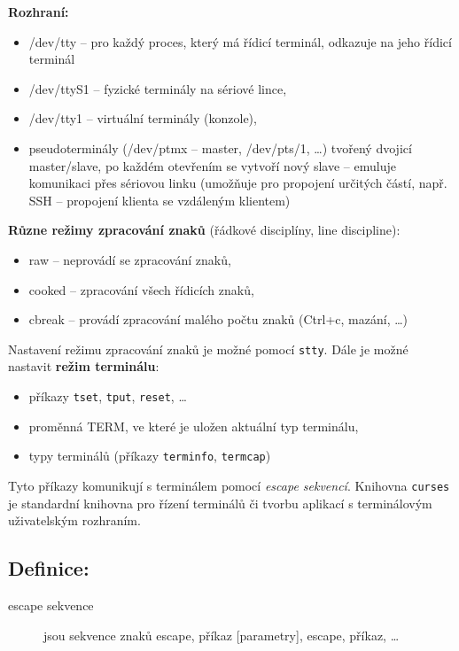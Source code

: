 \documentclass[a4paper, 11pt]{article}
\newcommand{\tcmd}[1]{\texttt{#1}}
\begin{document}
\textbf{Rozhraní:}
\begin{itemize}
    \item /dev/tty -- pro každý proces, který má řídicí terminál, odkazuje na jeho řídicí terminál
    \item /dev/ttyS1 -- fyzické terminály na sériové lince,
    \item /dev/tty1 -- virtuální terminály (konzole),
    \item pseudoterminály (/dev/ptmx -- master, /dev/pts/1, \ldots) tvořený dvojicí master/slave, po každém otevřením se vytvoří nový slave -- emuluje komunikaci přes sériovou linku (umožňuje pro propojení určitých částí, např. SSH -- propojení klienta se vzdáleným klientem) \\
\end{itemize}
 
\textbf{Různe režimy zpracování znaků} (řádkové disciplíny, line discipline):
\begin{itemize}
    \item raw -- neprovádí se zpracování znaků,
    \item cooked -- zpracování všech řídicích znaků,
    \item cbreak -- provádí zpracování malého počtu znaků (Ctrl+c, mazání, \ldots)
\end{itemize}
 
Nastavení režimu zpracování znaků je možné pomocí \tcmd{stty}. Dále je možné nastavit \textbf{režim terminálu}:
\begin{itemize}
    \item příkazy \tcmd{tset}, \tcmd{tput}, \tcmd{reset}, \ldots
    \item proměnná TERM, ve které je uložen aktuální typ terminálu,
    \item typy terminálů (příkazy \tcmd{terminfo}, \tcmd{termcap})
\end{itemize}
 
Tyto příkazy komunikují s terminálem pomocí \textit{escape sekvencí}. Knihovna \texttt{curses} je standardní knihovna pro řízení terminálů či tvorbu aplikací s terminálovým uživatelským rozhraním.
 
\subsection*{Definice:}
\begin{description}
\item[escape sekvence] jsou sekvence znaků escape, příkaz [parametry], escape, příkaz, \ldots
\end{description}
\end{document}
